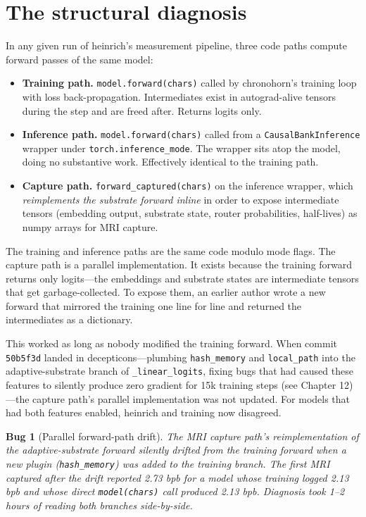 \documentclass[11pt,openany]{book}
\newtheorem{bug}{Bug}[chapter]
\begin{document}
\section{The structural diagnosis}

In any given run of heinrich's measurement pipeline, three code paths
compute forward passes of the same model:

\begin{itemize}
  \item \textbf{Training path.} \texttt{model.forward(chars)} called
  by chronohorn's training loop with loss back-propagation.
  Intermediates exist in autograd-alive tensors during the step and
  are freed after. Returns logits only.
  \item \textbf{Inference path.} \texttt{model.forward(chars)} called
  from a \texttt{CausalBankInference} wrapper under
  \texttt{torch.inference\_mode}. The wrapper sits atop the model,
  doing no substantive work. Effectively identical to the training path.
  \item \textbf{Capture path.} \texttt{forward\_captured(chars)} on the
  inference wrapper, which \emph{reimplements the substrate forward
  inline} in order to expose intermediate tensors (embedding output,
  substrate state, router probabilities, half-lives) as
  numpy arrays for MRI capture.
\end{itemize}

The training and inference paths are the same code modulo mode flags.
The capture path is a parallel implementation. It exists because the
training forward returns only logits---the embeddings and substrate
states are intermediate tensors that get garbage-collected. To expose
them, an earlier author wrote a new forward that mirrored the training
one line for line and returned the intermediates as a dictionary.

This worked as long as nobody modified the training forward. When
commit \texttt{50b5f3d} landed in decepticons---plumbing
\texttt{hash\_memory} and \texttt{local\_path} into the
adaptive-substrate branch of \texttt{\_linear\_logits}, fixing bugs
that had caused these features to silently produce zero gradient for
15k training steps (see Chapter 12)---the capture path's parallel
implementation was not updated. For models that had both features
enabled, heinrich and training now disagreed.

\begin{bug}[Parallel forward-path drift]
The MRI capture path's reimplementation of the adaptive-substrate
forward silently drifted from the training forward when a new plugin
(\texttt{hash\_memory}) was added to the training branch. The first
MRI captured after the drift reported 2.73 bpb for a model whose
training logged 2.13 bpb and whose direct \texttt{model(chars)} call
produced 2.13 bpb. Diagnosis took 1--2 hours of reading both
branches side-by-side.
\end{bug}
\end{document}
